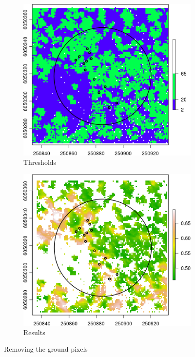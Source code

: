 \documentclass{subfiles}
\begin{document}
\begin{figure} [h!]
 	\begin{subfigure}[t]{.49\textwidth}
 		\centering
 		\includegraphics[width=\textwidth]{img/dead/c6_groundThres}
 		\caption{Thresholds} 
 		\label{fig:c6_groundMask}
 	\end{subfigure}
 	\begin{subfigure}[t]{.49\textwidth}
 		\centering
 		\includegraphics[width=\textwidth]{img/dead/c7_groundRemoved}
 		\caption{Results} 
 		\label{fig:c7_groundRemoved}
 	\end{subfigure}
 	\caption{Removing the ground pixels}  
 	\label{fig:GroundPixelsRemoval} 
 \end{figure}
 
\end{document}
